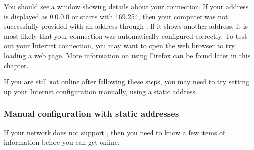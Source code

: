 

You should see a window showing details about your connection. If your  address is displayed as 0.0.0.0 or starts with 169.254, then your computer was not successfully provided with an address through . If it shows another address, it is most likely that your connection was automatically configured correctly. To test out your Internet connection, you may want to open the  web browser to try loading a web page. More information on using Firefox can be found later in this chapter.

If you are still not online after following these steps, you may need to try setting up your Internet configuration manually, using a static  address. 

\subsubsection{Manual configuration with static addresses}

If your network does not support , then you need to know a few items of information before you can get online.


